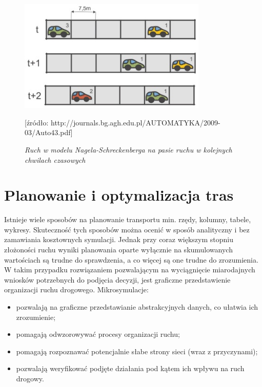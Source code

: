 \documentclass{sprawozdanie-agh}
\begin{document}
	\begin{figure}[H]
		\centering
		\includegraphics[width=0.8\textwidth]{N-Sch_1.jpg}
		\caption{\textit{Ruch w modelu Nagela-Schreckenberga na pasie ruchu w kolejnych chwilach czasowych}}
		[źródło: http://journals.bg.agh.edu.pl/AUTOMATYKA/2009-03/Auto43.pdf]
		\label{fig:N-Sch_1}
	\end{figure}



	\section{Planowanie i optymalizacja tras}

	Istnieje wiele sposobów na planowanie transportu min. rzędy, kolumny, tabele, wykresy. Skuteczność tych sposobów można ocenić w sposób analityczny i bez zamawiania kosztownych symulacji. Jednak przy coraz większym stopniu złożoności ruchu wyniki planowania oparte wyłącznie na skumulowanych wartościach są trudne do sprawdzenia, a co więcej są one trudne do zrozumienia. W takim przypadku rozwiązaniem pozwalającym na wyciągnięcie miarodajnych wniosków potrzebnych do podjęcia decyzji, jest graficzne przedstawienie organizacji ruchu drogowego. Mikrosymulacje:

	\begin{itemize}
		\item pozwalają na graficzne przedstawianie abstrakcyjnych danych, co ułatwia ich zrozumienie;
		\item pomagają odwzorowywać procesy organizacji ruchu;
		\item pomagają rozpoznawać potencjalnie słabe strony sieci (wraz z przyczynami);
		\item pozwalają weryfikować podjęte działania pod kątem ich wpływu na ruch drogowy.
	\end{itemize}
\end{document}
